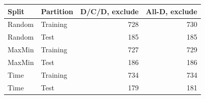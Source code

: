 \begin{center}
\begin{tabular}{llrr}
\toprule
Split & Partition & D/C/D, exclude & All-D, exclude \\
\midrule
Random & Training & 728 & 730 \\
Random & Test & 185 & 185 \\
MaxMin & Training & 727 & 729 \\
MaxMin & Test & 186 & 186 \\
Time & Training & 734 & 734 \\
Time & Test & 179 & 181 \\
\bottomrule
\end{tabular}
\end{center}
